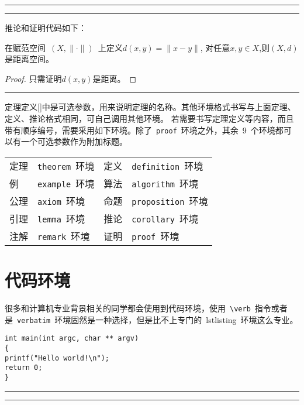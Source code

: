 \noindent\hrule\vspace{0.1em}

\noindent\hrule
\vspace{1em}
推论和证明代码如下：
\begin{VerbWithBreak}
\begin{corollary}[推论1]\label{cor:cor1}
在赋范空间~$(X,\|\cdot\|)$~上定义$d(x,y)=\|x-y\|$,
对任意$x,y\in X$,则$(X,d)$是距离空间。
\end{corollary}
\begin{proof}
  只需证明$d(x,y)$是距离。
\end{proof}
\end{VerbWithBreak}
\noindent\hrule\vspace{1em}

定理定义[]中是可选参数，用来说明定理的名称。其他环境格式书写与上面定理、定义、推论格式相同，可自己调用其他环境。
若需要书写定理定义等内容，而且带有顺序编号，需要采用如下环境。除了~\verb|proof|~环境之外，其余~9~个环境都可以有一个可选参数作为附加标题。

\begin{center}
\vspace{0.5em}\noindent\wuhao\begin{tabularx}{0.7\textwidth}{lX|lX}
定理 & \verb|theorem|~环境 & 定义 & \verb|definition|~环境 \\
例 & \verb|example|~环境 & 算法 & \verb|algorithm|~环境 \\
公理 & \verb|axiom|~环境 & 命题 & \verb|proposition|~环境 \\
引理 & \verb|lemma|~环境 & 推论 & \verb|corollary|~环境 \\
注解 & \verb|remark|~环境 & 证明 & \verb|proof|~环境 \\
\end{tabularx}
\end{center}
\section{代码环境}
很多和计算机专业背景相关的同学都会使用到代码环境，使用~\verb|\verb|~指令或者是~\verb|verbatim|~环境固然是一种选择，但是比不上专门的~lstlisting~环境这么专业。
\begin{lstlisting}
int main(int argc, char ** argv)
{
printf("Hello world!\n");
return 0;
}
\end{lstlisting}

\noindent\hrule
\vspace{0.1em}\noindent\hrule

\vspace{1em}


